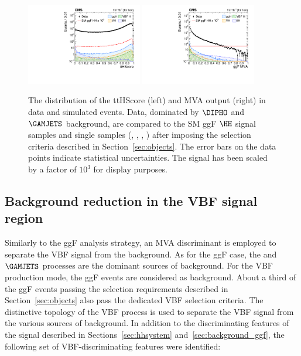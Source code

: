 \documentclass[11pt,a4paper,cmspaper,final,collab]{cms-tdr}
\begin{document}
\begin{figure}[thb]
  \centering
  \includegraphics[width=0.45\textwidth]{Figure_005-a.pdf}\hfil 
  \includegraphics[width=0.45\textwidth]{Figure_005-b.pdf}\hfil 
  \caption{The distribution of the ttHScore (left) and MVA output (right) in data and simulated events. Data, dominated by $\DIPHO$ and $\GAMJETS$ background, are compared to the SM ggF $\HH$ signal samples and single \PH samples (\ttH, \ggH, \VBFH, \VH) after imposing the selection criteria described in Section~\ref{sec:objects}. The error bars on the data points indicate statistical uncertainties. The \HH signal has been scaled by a factor of $10^{3}$ for display purposes. }
  \label{fig:cumulative}
\end{figure}




\subsection{Background reduction in the VBF \texorpdfstring{\HH}{HH} signal region}
\label{sec:background_vbf}

Similarly to the ggF \HH analysis strategy, an MVA discriminant is employed to separate the VBF \HH signal from the background. As for the ggF case, the \DIPHO and $\GAMJETS$ processes are the dominant sources of background. For the VBF production mode, the ggF \HH events are considered as background.
About a third of the ggF \HH events passing the selection requirements described in Section~\ref{sec:objects} also pass the dedicated VBF selection criteria. The distinctive topology of the VBF \HH process is used to separate the VBF \HH signal from the various sources of background. In addition to the discriminating features of the \HH signal described in Sections~\ref{sec:hhsystem} and~\ref{sec:background_ggf}, the following set of VBF-discriminating features were identified: 
\end{document}
